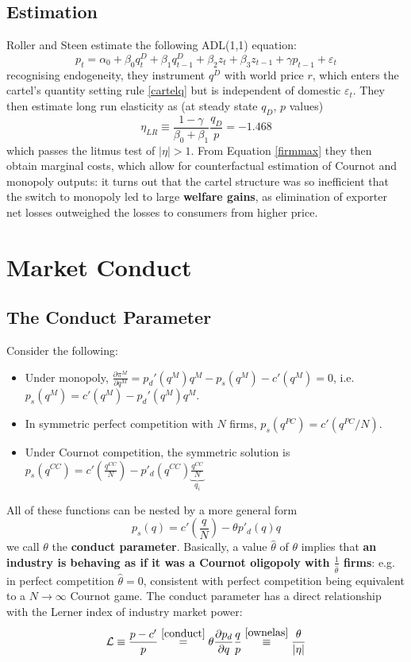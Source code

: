 \documentclass[11pt]{article}
\numberwithin{equation}{section}
\begin{document}
\subsection{Estimation}
Roller and Steen estimate the following ADL(1,1) equation:
\begin{equation}
	p_t = \alpha_0 + \beta_0 q^D_t + \beta_1 q^D_{t-1} + \beta_2 z_t + \beta_3 z_{t-1} + \gamma p_{t-1} + \varepsilon_t
\end{equation}
recognising endogeneity, they instrument $q^D$ with world price $r$, which enters the cartel's quantity setting rule \eqref{cartelq} but is independent of domestic $\varepsilon_t$.
They then estimate long run elasticity as (at steady state $q_D$, $p$ values)
\begin{equation}
	\eta_{LR} \equiv \frac{1 - \gamma}{\beta_0 + \beta_1} \frac{q_D}{p} = -1.468
\end{equation}
which passes the litmus test of $|\eta| > 1$.
From Equation \eqref{firmmax} they then obtain marginal costs, which allow for counterfactual estimation of Cournot and monopoly outputs: it turns out that the cartel structure was so inefficient that the switch to monopoly led to large \textbf{welfare gains}, as elimination of exporter net losses outweighed the losses to consumers from higher price.

\section{Market Conduct}
\subsection{The Conduct Parameter}
Consider the following:
\begin{itemize}
	\item Under monopoly, $\frac{\partial \pi^M}{\partial q^M} = p_d'(q^M)q^M - p_s(q^M) - c'(q^M)=0$, i.e. $p_s(q^M) = c'(q^M) - p_d'(q^M)q^M $.
	\item In symmetric perfect competition with $N$ firms, $p_s(q^{PC}) = c'(q^{PC}/N)$.
	\item Under Cournot competition, the symmetric solution is $ p_s(q^{CC}) = c'(\frac{q^{CC}}{N}) - p'_d(q^{CC}) \underbrace{\frac{q^{CC}}{N}}_{q_i}$
\end{itemize}
All of these functions can be nested by a more general form
\begin{equation}
	\label{conduct}
	p_s(q) = c'(\frac{q}{N}) - \theta p'_d(q)q
\end{equation}
we call $\theta$ the \textbf{conduct parameter}.
Basically, a value $\hat{\theta}$ of $\theta$ implies that \textbf{an industry is behaving as if it was a Cournot oligopoly with $\frac{1}{\hat{\theta}}$ firms}: e.g. in perfect competition $\hat{\theta}=0$, consistent with perfect competition being equivalent to a $N\rightarrow \infty$ Cournot game.
The conduct parameter has a direct relationship with the Lerner index of industry market power:
\begin{equation}
\label{lerner}
	\mathcal{L} \equiv \frac{p - c'}{p} \overset{\eqref{conduct}}{=} \theta \frac{\partial p_d}{\partial q} \frac{q}{p}  \overset{\eqref{ownelas}}{\equiv}  \frac{\theta}{|\eta|}
\end{equation}
\end{document}
